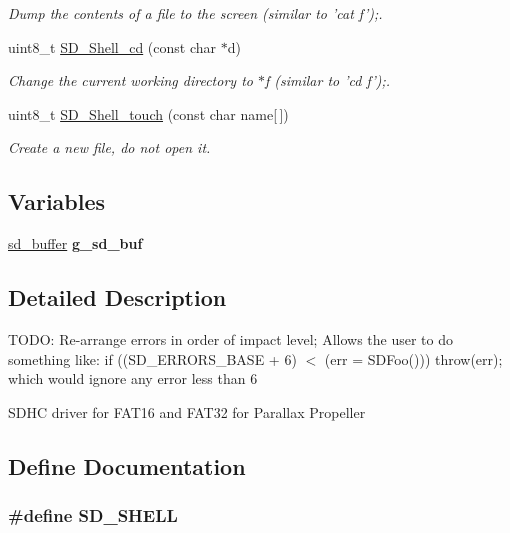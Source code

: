 \begin{DoxyCompactItemize}
\begin{DoxyCompactList}\small\item\em \-Dump the contents of a file to the screen (similar to 'cat f');. \end{DoxyCompactList}\item 
uint8\-\_\-t \hyperlink{group__SD__Card_gadf4f410c8c353e6a84f77e1df1b9e424}{\-S\-D\-\_\-\-Shell\-\_\-cd} (const char $\ast$d)
\begin{DoxyCompactList}\small\item\em \-Change the current working directory to $\ast$f (similar to 'cd f');. \end{DoxyCompactList}\item 
uint8\-\_\-t \hyperlink{group__SD__Card_gad2b78b0a9efcd14f43c2ab9e38d80e7f}{\-S\-D\-\_\-\-Shell\-\_\-touch} (const char name\mbox{[}$\,$\mbox{]})
\begin{DoxyCompactList}\small\item\em \-Create a new file, do not open it. \end{DoxyCompactList}\end{DoxyCompactItemize}
\subsection*{\-Variables}
\begin{DoxyCompactItemize}
\item 
\hypertarget{group__SD__Card_ga0bd95548a4187da52f3cda8634fefded}{\hyperlink{struct__sd__buffer}{sd\-\_\-buffer} {\bfseries g\-\_\-sd\-\_\-buf}}\label{group__SD__Card_ga0bd95548a4187da52f3cda8634fefded}

\end{DoxyCompactItemize}


\subsection{\-Detailed \-Description}
\-T\-O\-D\-O\-: \-Re-\/arrange errors in order of impact level; \-Allows the user to do something like\-: if ((\-S\-D\-\_\-\-E\-R\-R\-O\-R\-S\-\_\-\-B\-A\-S\-E + 6) $<$ (err = \-S\-D\-Foo())) throw(err); which would ignore any error less than 6

\-S\-D\-H\-C driver for \-F\-A\-T16 and \-F\-A\-T32 for \-Parallax \-Propeller 

\subsection{\-Define \-Documentation}
\hypertarget{group__SD__Card_ga453e7feb2ddf9256c6b5ab9399b12abc}{
\subsubsection[{\-S\-D\-\_\-\-S\-H\-E\-L\-L}]{\setlength{\rightskip}{0pt plus 5cm}\#define {\bf \-S\-D\-\_\-\-S\-H\-E\-L\-L}}}\label{group__SD__Card_ga453e7feb2ddf9256c6b5ab9399b12abc}


